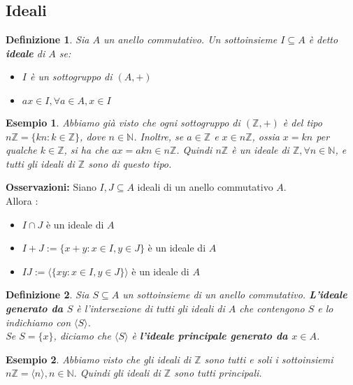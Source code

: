 \documentclass[a4paper,12pt]{article}
\theoremstyle{def}
\newtheorem*{definition}{Definizione}
\theoremstyle{prop}
\theoremstyle{esempio}
\newtheorem*{example}{Esempio}
\theoremstyle{dimostrazione}
\theoremstyle{teo}
\theoremstyle{osservazione}
\begin{document}
\subsection{Ideali}

\begin{definition}
	Sia \(A\) un anello commutativo. Un sottoinsieme \(I \subseteq A\) è detto \textbf{ideale} di \(A\) se:
	\
	\begin{itemize}
		\item \(I\) è un sottogruppo di \((A,+)\)
		\item \(ax \in I, \forall a \in A, x \in I\)
	\end{itemize}
\end{definition}

\begin{example}
	Abbiamo già visto che ogni sottogruppo di \((\mathbb{Z} , +)\) è del tipo \(n \mathbb{Z} = \{kn : k \in \mathbb{Z} \}\),
	dove \(n \in \mathbb{N} \). Inoltre, se \(a \in \mathbb{Z} \) e \(x \in n\mathbb{Z} \), ossia
	\(x=kn\) per qualche \(k \in \mathbb{Z} \), si ha che \(ax=akn \in n \mathbb{Z} \).
	Quindi \(n \mathbb{Z} \) è un ideale di \(\mathbb{Z}, \forall n \in \mathbb{N}  \), e tutti gli ideali di
	\(\mathbb{Z} \) sono di questo tipo.
\end{example}

\textbf{Osservazioni:} Siano \(I,J \subseteq A\) ideali di un anello commutativo \(A\).\\
Allora : \
\begin{itemize}
	\item \(I \cap J\) è un ideale di \(A\)
	\item \(I + J := \{x+y : x \in I, y \in J\}\) è un ideale di \(A\)
	\item \(IJ := \langle \{xy : x \in I, y \in J\} \rangle\) è un ideale di \(A\)
\end{itemize}

\begin{definition}
	Sia \(S \subseteq A\) un sottoinsieme di un anello commutativo. \textbf{L'ideale generato da \(S\)} è
	l'intersezione di tutti gli ideali di \(A\) che contengono \(S\) e lo indichiamo con \(\langle S \rangle\).\\
	Se \(S =\{x\}\), diciamo che \(\langle S \rangle\) è \textbf{l'ideale principale generato da \(x \in A\)}.
\end{definition}

\begin{example}
	Abbiamo visto che gli ideali di \(\mathbb{Z} \) sono tutti e soli i sottoinsiemi \(n \mathbb{Z}  = \langle n \rangle, n \in \mathbb{N} \).
	Quindi gli ideali di \(\mathbb{Z} \) sono tutti principali.
\end{example}
\end{document}

